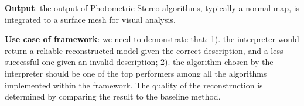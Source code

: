 \noindent\textbf{Output}: the output of Photometric Stereo algorithms, typically a normal map, is integrated to a surface mesh for visual analysis.

\noindent\textbf{Use case of framework}: we need to demonstrate that: 1). the interpreter would return a reliable reconstructed model given the correct description, and a less successful one given an invalid description; 2). the algorithm chosen by the interpreter should be one of the top performers among all the algorithms implemented within the framework. The quality of the reconstruction is determined by comparing the result to the baseline method.





